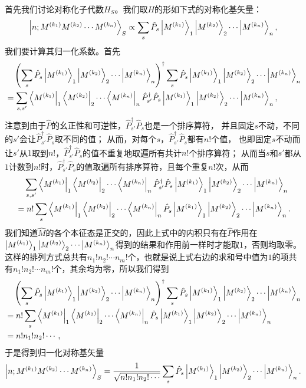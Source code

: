 \documentclass[hyperref, UTF8, a4paper]{ctexart}
\begin{document}
首先我们讨论对称化子代数$H_S$。我们取$H$的形如下式的对称化基矢量：
\[
    \ket{n; M^{(k_1)} M^{(k_2)} \cdots M^{(k_n)}}_S \propto \sum_s \hat{P}_s \ket{M^{(k_1)}}_1 \ket{M^{(k_2)}}_2 \cdots \ket{M^{(k_n)}}_n,
\]
我们要计算其归一化系数。首先
\[
    \begin{aligned}
        &\quad \left(\sum_s \hat{P}_s \ket{M^{(k_1)}}_1 \ket{M^{(k_2)}}_2 \cdots \ket{M^{(k_n)}}_n\right)^\dagger \sum_s \hat{P}_s \ket{M^{(k_1)}}_1 \ket{M^{(k_2)}}_2 \cdots \ket{M^{(k_n)}}_n \\
        &= \sum_{s, s'} \bra{M^{(k_1)}}_1 \bra{M^{(k_2)}}_2 \cdots \bra{M^{(k_n)}}_n \hat{P}_{s'}^\dagger \hat{P}_s \ket{M^{(k_1)}}_1 \ket{M^{(k_2)}}_2 \cdots \ket{M^{(k_n)}}_n, 
    \end{aligned}
\]
注意到由于$\hat{P}$的幺正性和可逆性，$\hat{P}_{s'}^\dagger \hat{P}_s$也是一个排序算符，
并且固定$s$不动，不同的$s'$会让$\hat{P}_{s'}^\dagger \hat{P}_s$取不同的值；
从而，对每个$s$，$\hat{P}_{s'}^\dagger \hat{P}_s$都有$n!$个值，
也即固定$s$不动而让$s'$从$1$取到$n!$，$\hat{P}_{s'}^\dagger \hat{P}_s$的值不重复地取遍所有共计$n!$个排序算符；
从而当$s$和$s'$都从$1$计数到$n!$时，$\hat{P}_{s'}^\dagger \hat{P}_s$的值取遍所有排序算符，且每个重复$n!$次，从而
\[
    \begin{aligned}
        &\quad \sum_{s, s'} \bra{M^{(k_1)}}_1 \bra{M^{(k_2)}}_2 \cdots \bra{M^{(k_n)}}_n \hat{P}_{s'}^\dagger \hat{P}_s \ket{M^{(k_1)}}_1 \ket{M^{(k_2)}}_2 \cdots \ket{M^{(k_n)}}_n \\
        &= n! \sum_s \bra{M^{(k_1)}}_1 \bra{M^{(k_2)}}_2 \cdots \bra{M^{(k_n)}}_n \hat{P}_s \ket{M^{(k_1)}}_1 \ket{M^{(k_2)}}_2 \cdots \ket{M^{(k_n)}}_n.
    \end{aligned}
\]
我们知道$\hat{M}$的各个本征态是正交的，因此上式中的内积只有在$\hat{P}$作用在$\ket{M^{(k_1)}}_1 \ket{M^{(k_2)}}_2 \cdots \ket{M^{(k_n)}}_n$得到的结果和作用前一样时才能取$1$，否则均取零。这样的排列方式总共有$n_1!n_2!\cdots n_m!$个，也就是说上式右边的求和号中值为$1$的项共有$n_1!n_2!\cdots n_m!$个，其余均为零，所以我们得到
\[
    \begin{aligned}
        &\quad \left(\sum_s \hat{P}_s \ket{M^{(k_1)}}_1 \ket{M^{(k_2)}}_2 \cdots \ket{M^{(k_n)}}_n\right)^\dagger \sum_s \hat{P}_s \ket{M^{(k_1)}}_1 \ket{M^{(k_2)}}_2 \cdots \ket{M^{(k_n)}}_n \\
        &= n! \sum_s \bra{M^{(k_1)}}_1 \bra{M^{(k_2)}}_2 \cdots \bra{M^{(k_n)}}_n \hat{P}_s \ket{M^{(k_1)}}_1 \ket{M^{(k_2)}}_2 \cdots \ket{M^{(k_n)}}_n \\
        &= n! n_1 ! n_2! \cdots ,
    \end{aligned}
\]
于是得到归一化对称基矢量
\begin{equation}
    \ket{n; M^{(k_1)} M^{(k_2)} \cdots M^{(k_n)}}_S = \frac{1}{\sqrt{n! n_1 ! n_2! \cdots}} \sum_s \hat{P}_s \ket{M^{(k_1)}}_1 \ket{M^{(k_2)}}_2 \cdots \ket{M^{(k_n)}}_n.
    \label{eq:sym-basis}
\end{equation}
\end{document}
